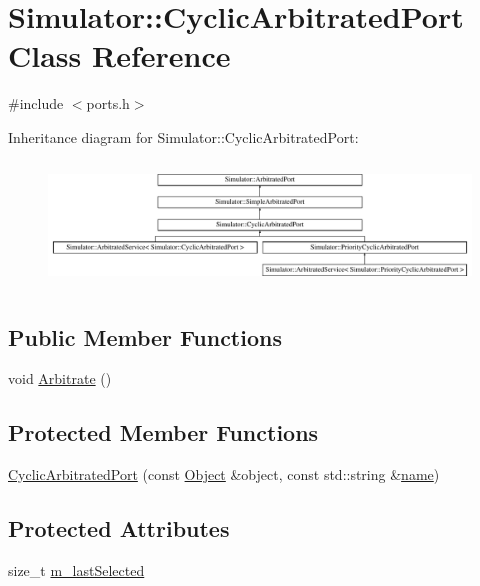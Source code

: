 \hypertarget{class_simulator_1_1_cyclic_arbitrated_port}{\section{Simulator\+:\+:Cyclic\+Arbitrated\+Port Class Reference}
\label{class_simulator_1_1_cyclic_arbitrated_port}
}


{\ttfamily \#include $<$ports.\+h$>$}

Inheritance diagram for Simulator\+:\+:Cyclic\+Arbitrated\+Port\+:\begin{figure}[H]
\begin{center}
\leavevmode
\includegraphics[height=3.365385cm]{class_simulator_1_1_cyclic_arbitrated_port}
\end{center}
\end{figure}
\subsection*{Public Member Functions}
\begin{DoxyCompactItemize}
\item 
void \hyperlink{class_simulator_1_1_cyclic_arbitrated_port_afaab298eeb4e4ffb377d6c69fec1638d}{Arbitrate} ()
\end{DoxyCompactItemize}
\subsection*{Protected Member Functions}
\begin{DoxyCompactItemize}
\item 
\hyperlink{class_simulator_1_1_cyclic_arbitrated_port_a003c7b7cd55d70350f8f5e8ddae5b30e}{Cyclic\+Arbitrated\+Port} (const \hyperlink{class_simulator_1_1_object}{Object} \&object, const std\+::string \&\hyperlink{mtconf_8c_a8f8f80d37794cde9472343e4487ba3eb}{name})
\end{DoxyCompactItemize}
\subsection*{Protected Attributes}
\begin{DoxyCompactItemize}
\item 
size\+\_\+t \hyperlink{class_simulator_1_1_cyclic_arbitrated_port_af90afe3374d413eeb1425ec0bd293677}{m\+\_\+last\+Selected}
\end{DoxyCompactItemize}
